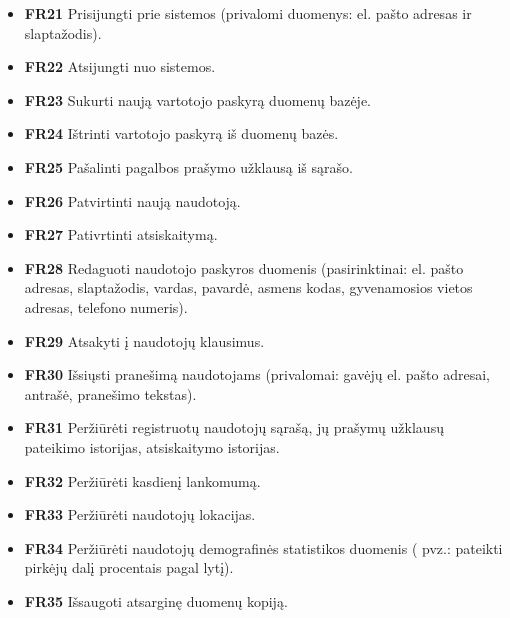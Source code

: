 \documentclass{VUMIFPSbakalaurinis}
\begin{document}
\begin{itemize}
	\item \textbf{FR21} Prisijungti prie sistemos (privalomi duomenys: el. pašto adresas ir slaptažodis).
	\item \textbf{FR22} Atsijungti nuo sistemos.
	\item \textbf{FR23} Sukurti naują vartotojo paskyrą duomenų bazėje.
	\item \textbf{FR24} Ištrinti vartotojo paskyrą iš duomenų bazės.
	\item \textbf{FR25} Pašalinti pagalbos prašymo užklausą iš sąrašo.
	\item \textbf{FR26} Patvirtinti naują naudotoją.
	\item \textbf{FR27} Pativrtinti atsiskaitymą.
	\item \textbf{FR28} Redaguoti naudotojo paskyros duomenis (pasirinktinai: el. pašto adresas, slaptažodis, vardas, pavardė, asmens kodas, gyvenamosios vietos adresas, telefono numeris).
	\item \textbf{FR29} Atsakyti į naudotojų klausimus.
	\item \textbf{FR30} Išsiųsti pranešimą naudotojams (privalomai: gavėjų el. pašto adresai, antrašė, pranešimo tekstas).
	\item \textbf{FR31} Peržiūrėti registruotų naudotojų sąrašą, jų prašymų užklausų pateikimo istorijas, atsiskaitymo istorijas.
	\item \textbf{FR32} Peržiūrėti kasdienį lankomumą.
	\item \textbf{FR33} Peržiūrėti naudotojų lokacijas.
	\item \textbf{FR34} Peržiūrėti naudotojų demografinės statistikos duomenis ( pvz.: pateikti pirkėjų dalį procentais pagal lytį).
	\item \textbf{FR35} Išsaugoti atsarginę duomenų kopiją.
\end{itemize}
\end{document}

